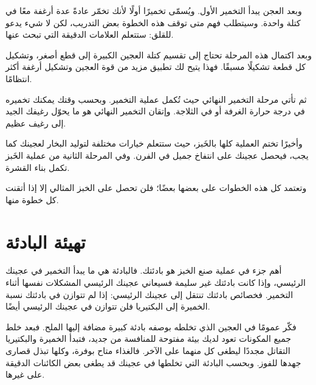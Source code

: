 وبعد العجن يبدأ التخمير الأول. ويُسمّى تخميرًا أولًا لأنك تخمّر عادةً عدة أرغفة معًا في كتلة واحدة. وسيتطلب فهم متى توقف هذه الخطوة بعض التدريب، لكن لا شيء يدعو للقلق: ستتعلم العلامات الدقيقة التي تبحث عنها.

وبعد اكتمال هذه المرحلة تحتاج إلى تقسيم كتلة العجين الكبيرة إلى قطع أصغر، وتشكيل كل قطعة تشكيلًا مسبقًا. فهذا يتيح لك تطبيق مزيد من قوة العجين وتشكيل أرغفة أكثر انتظامًا.

ثم تأتي مرحلة التخمير النهائي حيث تُكمل عملية التخمير. وبحسب وقتك يمكنك تخميره في درجة حرارة الغرفة أو في الثلاجة. وإتقان التخمير النهائي هو ما يحوّل رغيفك الجيد إلى رغيف عظيم.

وأخيرًا تختم العملية كلها بالخَبز، حيث ستتعلم خيارات مختلفة لتوليد البخار لعجينك كما يجب، فيحصل عجينك على انتفاخ جميل في الفرن. وفي المرحلة الثانية من عملية الخَبز تكمل بناء القشرة.

وتعتمد كل هذه الخطوات على بعضها بعضًا؛ فلن تحصل على الخبز المثالي إلا إذا أتقنت كل خطوة منها.

\section{تهيئة البادئة}%
\label{sec:readying-starter}

أهم جزء في عملية صنع الخبز هو بادئتك. فالبادئة هي ما يبدأ التخمير في عجينك الرئيسي، وإذا كانت بادئتك غير سليمة فسيعاني عجينك الرئيسي المشكلات نفسها أثناء التخمير. فخصائص بادئتك تنتقل إلى عجينك الرئيسي: إذا لم تتوازن في بادئتك نسبة الخميرة إلى البكتيريا فلن تتوازن في عجينك الرئيسي أيضًا.

\begin{flowchart}[!htb]

\caption[عملية تهيئة البادئة قبل الخَبز]{العملية التي تفحص بها بادئتك الحامضة عند صنع العجائن القمحية. عمليًّا، أستخدم كثيرًا بادئة حامضة صلبة، والبادئة الصلبة تتميز بنشاط خميرة معزّز، وفي هذه الحالة يمكنك استخدام النسب نفسها المبيّنة في المخطط ما عدا كمية الماء: فالترطيب في البادئة الصلبة يبلغ . إذن ستستخدم نصف كميات الماء المبيّنة، أي إذا أظهر المخطط  من الماء فستستخدم  من الماء لبادئتك الصلبة.}
\label{fig:process-starter-wheat-sourdough}
\end{flowchart}

فكّر عمومًا في العجين الذي تخلطه بوصفه بادئة كبيرة مضافة إليها الملح. فبعد خلط جميع المكونات تعود لديك بيئة مفتوحة للمنافسة من جديد، فتبدأ الخميرة والبكتيريا التقاتل مجددًا ليطغى كل منهما على الآخر. فالغذاء متاح بوفرة، وكلها تبذل قصارى جهدها للفوز. وبحسب البادئة التي تخلطها في عجينك قد يطغى بعض الكائنات الدقيقة على غيرها.

